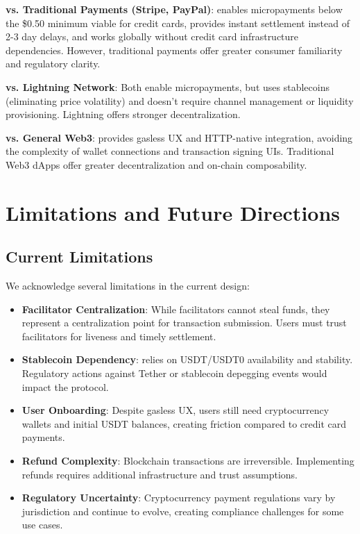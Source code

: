 \textbf{vs. Traditional Payments (Stripe, PayPal)}: \tprotocol{} enables micropayments below the \$0.50 minimum viable for credit cards, provides instant settlement instead of 2-3 day delays, and works globally without credit card infrastructure dependencies. However, traditional payments offer greater consumer familiarity and regulatory clarity.

\textbf{vs. Lightning Network}: Both enable micropayments, but \tprotocol{} uses stablecoins (eliminating price volatility) and doesn't require channel management or liquidity provisioning. Lightning offers stronger decentralization.

\textbf{vs. General Web3}: \tprotocol{} provides gasless UX and HTTP-native integration, avoiding the complexity of wallet connections and transaction signing UIs. Traditional Web3 dApps offer greater decentralization and on-chain composability.

\section{Limitations and Future Directions}
\label{sec:limitations}

\subsection{Current Limitations}

We acknowledge several limitations in the current \tprotocol{} design:

\begin{itemize}
    \item \textbf{Facilitator Centralization}: While facilitators cannot steal funds, they represent a centralization point for transaction submission. Users must trust facilitators for liveness and timely settlement.

    \item \textbf{Stablecoin Dependency}: \tprotocol{} relies on USDT/USDT0 availability and stability. Regulatory actions against Tether or stablecoin depegging events would impact the protocol.

    \item \textbf{User Onboarding}: Despite gasless UX, users still need cryptocurrency wallets and initial USDT balances, creating friction compared to credit card payments.

    \item \textbf{Refund Complexity}: Blockchain transactions are irreversible. Implementing refunds requires additional infrastructure and trust assumptions.

    \item \textbf{Regulatory Uncertainty}: Cryptocurrency payment regulations vary by jurisdiction and continue to evolve, creating compliance challenges for some use cases.
\end{itemize}

